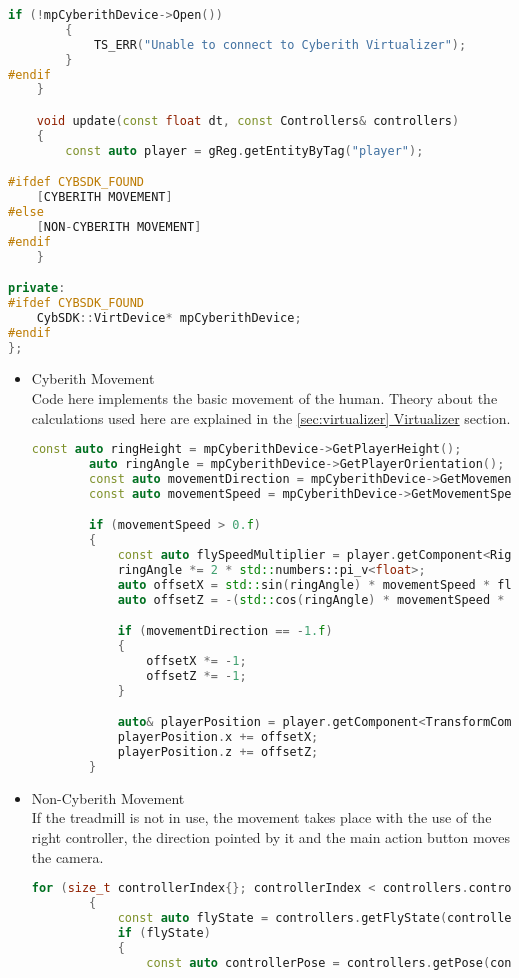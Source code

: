 \begin{itemize}
\begin{lstlisting}[language=c++, caption=\texttt{Movementsystem} class (./engine/src/ecs/systems/movement\_system.hpp)]
        if (!mpCyberithDevice->Open())
        {
            TS_ERR("Unable to connect to Cyberith Virtualizer");
        }
#endif
    }

    void update(const float dt, const Controllers& controllers)
    {
        const auto player = gReg.getEntityByTag("player");

#ifdef CYBSDK_FOUND
    [CYBERITH MOVEMENT]
#else
    [NON-CYBERITH MOVEMENT]
#endif
    }

private:
#ifdef CYBSDK_FOUND
    CybSDK::VirtDevice* mpCyberithDevice;
#endif
};
\end{lstlisting}
    \begin{itemize}
        \item Cyberith Movement\\
        \label{cyb_movement}
        Code here implements the basic movement of the human. Theory about the calculations used here are explained in the \hyperref[sec:virtualizer]{\ref*{sec:virtualizer} Virtualizer} section.
\begin{lstlisting}[language=c++, caption=Movement code with Cyberith (./engine/src/ecs/systems/movement\_system.hpp)]
        const auto ringHeight = mpCyberithDevice->GetPlayerHeight();
        auto ringAngle = mpCyberithDevice->GetPlayerOrientation();
        const auto movementDirection = mpCyberithDevice->GetMovementDirection();
        const auto movementSpeed = mpCyberithDevice->GetMovementSpeed();

        if (movementSpeed > 0.f)
        {
            const auto flySpeedMultiplier = player.getComponent<RigidBodyComponent>().velocity;
            ringAngle *= 2 * std::numbers::pi_v<float>;
            auto offsetX = std::sin(ringAngle) * movementSpeed * flySpeedMultiplier * dt;
            auto offsetZ = -(std::cos(ringAngle) * movementSpeed * flySpeedMultiplier * dt);

            if (movementDirection == -1.f)
            {
                offsetX *= -1;
                offsetZ *= -1;
            }

            auto& playerPosition = player.getComponent<TransformComponent>().pos;
            playerPosition.x += offsetX;
            playerPosition.z += offsetZ;
        }
\end{lstlisting}
        \item Non-Cyberith Movement\\
        \label{noncyb_movement}
        If the treadmill is not in use, the movement takes place with the use of the right controller, the direction pointed by it and the main action button moves the camera. 
\begin{lstlisting}[language=c++, caption=Movement code without Cyberith (./engine/src/ecs/systems/movement\_system.hpp)]
        for (size_t controllerIndex{}; controllerIndex < controllers.controllerCount; ++controllerIndex)
        {
            const auto flyState = controllers.getFlyState(controllerIndex);
            if (flyState)
            {
                const auto controllerPose = controllers.getPose(controllerIndex)[2];


\end{lstlisting}
\end{itemize}
\end{itemize}
